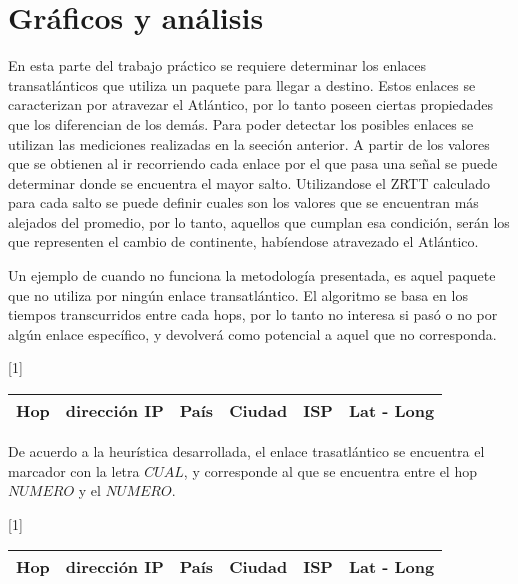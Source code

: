 \section{Gráficos y análisis}

En esta parte del trabajo práctico se requiere determinar los enlaces transatlánticos que utiliza un paquete para llegar a destino. Estos enlaces se caracterizan por atravezar el Atlántico, por lo tanto poseen ciertas propiedades que los diferencian de los demás. Para poder detectar los posibles enlaces se utilizan las mediciones realizadas en la seeción anterior. A partir de los valores que se obtienen al ir recorriendo cada enlace por el que pasa una señal se puede determinar donde se encuentra el mayor salto. 
Utilizandose el ZRTT calculado para cada salto se puede definir cuales son los valores que se encuentran más alejados del promedio, por lo tanto, aquellos que cumplan esa condición, serán los que representen el cambio de continente, habíendose atravezado el Atlántico. 

Un ejemplo de cuando no funciona la metodología presentada, es aquel paquete que no utiliza por ningún enlace transatlántico. El algoritmo se basa en los tiempos transcurridos entre cada hops, por lo tanto no interesa si pasó o no por algún enlace específico, y devolverá como potencial a aquel que no corresponda. 


\begin{center}
\scalebox{0.7}[1]{
 \begin{tabular}{|l|l|l|l|l|l|}
    \hline
    Hop & dirección IP & País & Ciudad & ISP & Lat - Long 	\\
    \hline

    \hline
 \end{tabular}}
\end{center}

De acuerdo a la heurística desarrollada, el enlace trasatlántico se encuentra el marcador con la letra $CUAL$, y corresponde al que se encuentra entre el hop $NUMERO$ y el $NUMERO$. 


\begin{center}
\scalebox{0.7}[1]{
 \begin{tabular}{|l|l|l|l|l|l|}
    \hline
    Hop & dirección IP & País & Ciudad & ISP & Lat - Long 	\\
    \hline

    \hline
 \end{tabular}}
\end{center}


